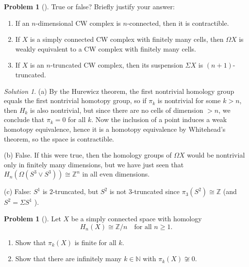 \documentclass[reqno]{amsart}
\theoremstyle{definition}
\newtheorem{problem}[theorem]{Problem}
\theoremstyle{remark}
\newtheorem*{solution}{Solution}
\begin{document}
    \begin{problem}[]
        True or false? Briefly justify your answer:
        \begin{enumerate}
            \item If an $n$-dimensional CW complex is $n$-connected,
                then it is contractible.
            \item If $X$ is a simply connected CW complex
                with finitely many cells, then
                $\Omega X$ is weakly equivalent to a CW complex
                with finitely many cells.
            \item If $X$ is an $n$-truncated CW complex, then
                its suspension $\Sigma X$ is
                $(n+1)$-truncated.
        \end{enumerate}
    \end{problem}

    \begin{solution}
        (a) By the Hurewicz theorem, the first nontrivial
        homology group equals the first nontrivial homotopy
        group, so if $\pi_k$ is nontrivial for some
        $k>n$, then $H_k$ is also nontrivial, but since
        there are no cells of dimension $>n$, we conclude
        that $\pi_k = 0$ for all $k$. Now the inclusion of
        a point induces a weak homotopy equivalence, hence
        it is a homotopy equivalence by Whitehead's theorem, so
        the space is contractible.\\
        \linebreak
        

        (b) False. If this were true, then
        the homology groups
        of $\Omega X$ would be nontrivial only in finitely
        many dimensions, but
        we have just seen that
        $H_n \left( \Omega \left( S^{3} \vee S^{3} \right)  \right) 
        \cong \mathbb{Z}^{n}$ in all even dimensions.\\
        \linebreak
        
        (c) False: $S^{1}$ is $2$-truncated, but
        $S^2$ is not $3$-truncated since
        $\pi_3 \left( S^2 \right) \cong \mathbb{Z}$ (and
        $S^2 = \Sigma S^{1}$ ).
    \end{solution}

    \begin{problem}[]
        Let $X$ be a simply connected space with
        homology
        \[
        H_n(X) \cong \mathbb{Z}/n \quad \text{for all }
        n\ge 1.
        \] 
        \begin{enumerate}
            \item Show that $\pi_k(X)$ is finite for all
                $k$.
            \item Show that there are infinitely many
                $k \in \mathbb{N} $ with $\pi_k(X) \not \cong
                0$.
        \end{enumerate}
    \end{problem}
\end{document}
